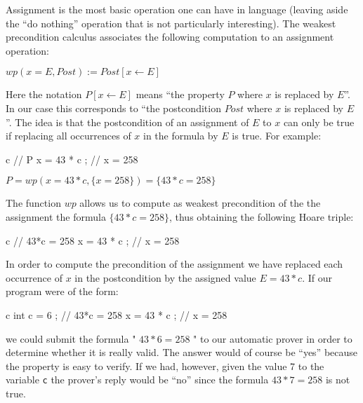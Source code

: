 \documentclass[middle]{zmdocument}
\begin{document}
Assignment is the most basic operation one can have in language (leaving
aside the ``do nothing'' operation that is not particularly
interesting). The weakest precondition calculus associates the following
computation to an assignment operation:




\begin{center}
$wp(x = E , Post) := Post[x \leftarrow E]$


\end{center}


Here the notation $P[x \leftarrow E]$ means ``the property $P$ where
$x$ is replaced by $E$''. In our case this corresponds to ``the
postcondition $Post$ where $x$ is replaced by $E$''. The idea is
that the postcondition of an assignment of $E$ to $x$ can only be
true if replacing all occurrences of $x$ in the formula by $E$ is
true. For example:



\begin{CodeBlock}{c}
// { P }
x = 43 * c ;
// { x = 258 }
\end{CodeBlock}




\begin{center}
$P = wp(x = 43*c , \{x = 258\}) = \{43*c = 258\}$


\end{center}


The function $wp$ allows us to compute as weakest precondition of the
the assignment the formula $\{43*c = 258\}$, thus obtaining the
following Hoare triple:



\begin{CodeBlock}{c}
// { 43*c = 258 }
x = 43 * c ;
// { x = 258 }
\end{CodeBlock}



In order to compute the precondition of the assignment we have replaced
each occurrence of $x$ in the postcondition by the assigned value
$E = 43*c$. If our program were of the form:



\begin{CodeBlock}{c}
int c = 6 ;
// { 43*c = 258 }
x = 43 * c ;
// { x = 258 }
\end{CodeBlock}



we could submit the formula " $43*6 = 258$ " to our automatic prover
in order to determine whether it is really valid. The answer would of
course be ``yes'' because the property is easy to verify. If we had,
however, given the value 7 to the variable \texttt{c} the prover's reply
would be ``no'' since the formula $43*7 = 258$ is not true.
\end{document}
